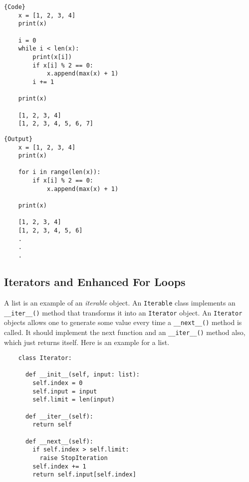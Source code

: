   \noindent\begin{minipage}{.5\textwidth}
  \begin{lstlisting}[]{Code}
    x = [1, 2, 3, 4] 
    print(x)

    i = 0 
    while i < len(x): 
        print(x[i])
        if x[i] % 2 == 0: 
            x.append(max(x) + 1) 
        i += 1

    print(x)

    [1, 2, 3, 4]
    [1, 2, 3, 4, 5, 6, 7] 
  \end{lstlisting}
  \end{minipage}
  \hfill
  \begin{minipage}{.49\textwidth}
  \begin{lstlisting}[]{Output}
    x = [1, 2, 3, 4]
    print(x)

    for i in range(len(x)): 
        if x[i] % 2 == 0: 
            x.append(max(x) + 1) 

    print(x)

    [1, 2, 3, 4]
    [1, 2, 3, 4, 5, 6]
    .
    .
    .
  \end{lstlisting}
  \end{minipage}

\subsection{Iterators and Enhanced For Loops}

  A list is an example of an \textit{iterable} object. An \texttt{Iterable} class implements an \texttt{\_\_iter\_\_()} method that transforms it into an \texttt{Iterator} object. An \texttt{Iterator} objects allows one to generate some value every time a \texttt{\_\_next\_\_()} method is called. It should implement the next function and an \texttt{\_\_iter\_\_()} method also, which just returns itself. Here is an example for a list. 

  \begin{lstlisting}
    class Iterator: 

      def __init__(self, input: list): 
        self.index = 0 
        self.input = input
        self.limit = len(input)

      def __iter__(self): 
        return self

      def __next__(self): 
        if self.index > self.limit: 
          raise StopIteration
        self.index += 1 
        return self.input[self.index]
  \end{lstlisting}

